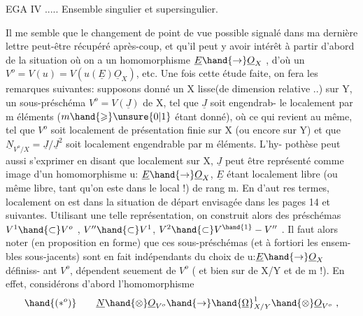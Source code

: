 
EGA IV ..... Ensemble singulier et supersingulier.

Il me semble que le changement de point de vue possible signalé dans ma
dernière lettre peut-être récupéré après-coup, et qu'il peut y avoir intérêt
à partir d'abord de la situation où on a  un homomorphisme $\underline{E}\hand{\to}\underline{O}_X$ , d'où
un $V^o = V(u) = V(u(\underline{E})\underline{O}_X)$, etc. Une fois cette étude faite, on fera les
remarques suivantes: supposons donné un X lisse(de dimension relative  ..)
sur Y, un sous-préschéma $V^o = V(\underline{J})$ de X, tel que $\underline{J}$ soit engendrab-%
le localement  par m éléments ($m\hand{\geqslant}\unsure{0|1}$ étant donné), où ce qui revient au
même, tel que $V^o$ soit localement de présentation finie sur X (ou encore sur
Y) et que  $\underline{N}_{V^o/X} = \underline{J}/\underline{J}^2$  soit localement engendrable par m éléments.  L'hy-%
pothèse peut aussi s'exprimer en disant que localement sur X, $\underline{J}$ peut être
représenté comme image d'un homomorphisme  u: $\underline{E}\hand{\to}\underline{O}_X$, $\underline{E}$ étant localement
libre (ou même libre, tant qu'on este dans le local !) de rang m.  En d'aut
res termes, localement on est dans la situation de départ envisagée dans
les pages 14 et suivantes. Utilisant une telle représentation, on construit
alors des préschémas  $V^1 \hand{\subset} V^o$ , $V'' \hand{\subset} V^1$, $V^2 \hand{\subset} V^{\hand{1}}-V''$ . Il faut alors noter
(en proposition en forme) que ces sous-préschémas (et à fortiori les ensem-%
bles sous-jacents) sont en fait indépendants du choix de u:$\underline{E}\hand{\to}\underline{O}_X$ définiss-%
ant $V^o$,   dépendent seuement de  $V^o$ ( et bien sur de X/Y et de
m !).  En effet, considérons d'abord  l'homomorphisme
\[ \hand{(*^o)} \qquad \underline{N}\hand{\otimes}\underline{O}_{V^o}\hand{\to}\hand{\underline{\Omega}}^1_{X/Y}\hand{\otimes}\underline{O}_{V^o} \ , \]
